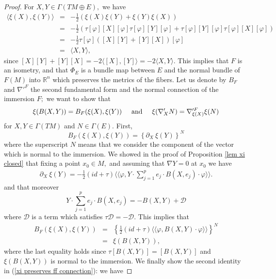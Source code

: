 \documentclass{amsart}
\begin{document}
\begin{proof}
For $X,Y\in\Gamma(TM\oplus E),$ we have
\begin{eqnarray*}
\langle \xi(X),\xi(Y)\rangle &=&-\frac{1}{2}\left(\xi(X)\xi(Y)+\xi(Y)\xi(X)\right)\\
&=&-\frac{1}{2}\left(\tau[\varphi][X][\varphi]\tau[\varphi][Y][\varphi]+\tau[\varphi][Y][\varphi]\tau[\varphi][X][\varphi]\right)\\
&=&-\frac{1}{2}\tau[\varphi]\left([X][Y]+[Y][X]\right)[\varphi]\\
&=&\langle X,Y\rangle,
\end{eqnarray*}
since $[X][Y]+[Y][X]=-2\langle[X],[Y]\rangle=-2\langle X,Y\rangle.$ This implies that $F$ is an isometry, and that $\Phi_E$ is a bundle map between $E$ and the normal bundle of $F(M)$ into ${\mathbb{R}}^n$ which preserves the metrics of the fibers. Let us denote by $B_F$ and $\nabla'^F$ the second fundamental form and the normal connection of the immersion $F;$ we want to show that
\begin{equation}\label{xi preserves ff connection}
\xi(B(X,Y))=B_F(\xi(X),\xi(Y))\hspace{.5cm}\mbox{and}\hspace{.5cm}\xi(\nabla'_XN)=\nabla'^F_{\xi(X)}\xi(N)
\end{equation}
for $X,Y\in \Gamma(TM)$ and $N\in\Gamma(E).$ First,
$$B_F(\xi(X),\xi(Y))=\left\{\partial_X\ \xi(Y)\right\}^N$$
where the superscript $N$ means that we consider the component of the vector which is normal to the immersion. We showed in the proof of Proposition \ref{lem xi closed} that fixing a point $x_0\in M,$ and assuming that $\nabla Y=0$ at $x_0$ we have 
\begin{eqnarray*}
\partial_X\ \xi(Y)=-\frac{1}{2}(id+\tau)\langle\langle \varphi,Y\cdot\sum_{j=1}^pe_j\cdot B(X,e_j)\cdot\varphi\rangle\rangle.
\end{eqnarray*}  
and that moreover 
$$Y\cdot\sum_{j=1}^pe_j\cdot B(X,e_j)=-B(X,Y)+\mathcal{D}$$
where $\mathcal{D}$ is a term which satisfies $\tau\mathcal{D}=-\mathcal{D}.$ This implies that
\begin{eqnarray*}
B_F(\xi(X),\xi(Y))&=&\left\{\frac{1}{2}(id+\tau)\langle\langle \varphi,B(X,Y)\cdot\varphi\rangle\rangle\right\}^N\\
&=&\xi(B(X,Y)),
\end{eqnarray*}
where the last equality holds since $\tau[B(X,Y)]=[B(X,Y)]$ and $\xi(B(X,Y))$ is normal to the immersion. We finally show the second identity in (\ref{xi preserves ff connection}): we have

\end{proof}
\end{document}

